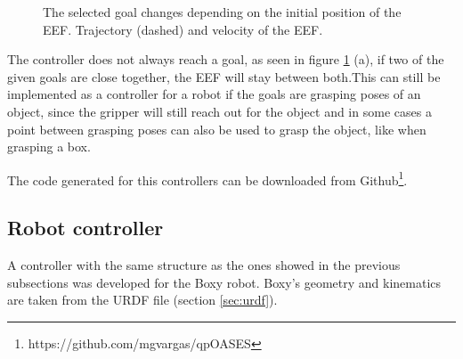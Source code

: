 \begin{figure}[H]
	\centering
	\begin{subfigure}[EEF closer to goal 2 (dotted)]
		{\texttt{[image: controllers/dyn\_3\_eef\_1.png]}}
	\end{subfigure}
	\begin{subfigure}[EEF closer to goal 1 (thin dotted)]
		{\texttt{[image: controllers/dyn\_3\_eef\_2.png]}}
	\end{subfigure}
	\vspace{-2pt}
	\caption[Dynamic weights: EEF]{The selected goal changes depending on the initial position of the EEF. Trajectory (dashed) and velocity of the EEF.}
	\vspace{-15pt}
	\label{fig:dynamic3}
\end{figure}
The controller does not always reach a goal, as seen in figure \ref{fig:dynamic3} (a), if two of the given goals are close together, the EEF will stay between both.This can still be implemented as a controller for a robot if the goals are grasping poses of an object, since the gripper will still reach out for the object and in some cases a point between grasping poses can also be used to grasp the object, like when grasping a box.

The code generated for this controllers can be downloaded from Github\footnote{https://github.com/mgvargas/qpOASES}.

\subsection{Robot controller}

A controller with the same structure as the ones showed in the previous subsections was developed for the Boxy robot. Boxy's geometry and kinematics are taken from the URDF file (section \ref{sec:urdf}). 

